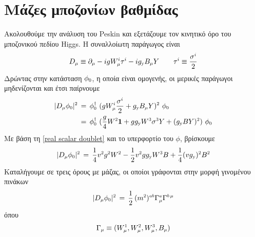 \section{Μάζες μποζονίων βαθμίδας}
Ακολουθούμε την ανάλυση 
του Peskin \cite{Peskin:1995ev} και εξετάζουμε τον κινητικό όρο του μποζονικού πεδίου Higgs. Η συναλλοίωτη παράγωγος είναι 
\begin{equation}\label{covariant derivative electroweak theory}
    D\subscr{\mu}\equiv\partial\subscr{\mu}-igW\superscr{i}\subscr{\mu}\tau\superscr{i}-ig\subscr{\text{y}}B\subscr{\mu}Y\qquad\tau\superscr{i}\equiv\frac{\sigma\superscr{i}}{2}
\end{equation}
Δρώντας στην κατάσταση $\phi\subscr{0}$, η οποία είναι ομογενής, οι μερικές παράγωγοι μηδενίζονται και έτσι παίρνουμε
\begin{equation}
\begin{split}
    |D\subscr{\mu}\phi\subscr{0}|\superscr{2}\,&=\,\phi\subscr{0}\superscr{\dagger}\,\,(gW\superscr{i}\subscr{\mu}\frac{\sigma\superscr{i}}{2}+g\subscr{\y}B\subscr{\mu}Y)\superscr{2}\,\,\phi\subscr{0}\\
    &=\,\phi\subscr{0}\superscr{\dagger}\,\,(\frac{g}{4}W\superscr{2}\mathbf{1}+gg\subscr{\y}W\superscr{3}\sigma\superscr{3}Y+(g\subscr{\y}BY)\superscr{2})\,\,\phi\subscr{0}
\end{split}
\end{equation}
Με βάση τη \eqref{real scalar doublet} και το υπερφορτίο του $\phi$, βρίσκουμε
\begin{equation}
    |D\subscr{\mu}\phi\subscr{0}|\superscr{2}\,=\,\frac{1}{4}v\superscr{2}g\superscr{2}W\superscr{2}-\frac{1}{2}v\superscr{2}gg\subscr{\y}W\superscr{3}B+\frac{1}{4}(vg\subscr{\y})\superscr{2}B\superscr{2}
\end{equation}
Καταλήγουμε σε τρεις όρους με μάζας, 
οι οποίοι 
γράφονται στην 
μορφή γινομένου πινάκων 
\begin{equation}
    |D\subscr{\mu}\phi\subscr{0}|\superscr{2}\,=\,\frac{1}{2}\,(m\superscr{2})\superscr{ab}\Gamma\superscr{a}\subscr{\mu}\Gamma\superscr{b\,\mu}
\end{equation}
όπου
\begin{equation}\label{A quadraplet}
    \Gamma\subscr{\mu}\equiv (W\superscr{1}\subscr{\mu}, W\superscr{2}\subscr{\mu}, W\superscr{3}\subscr{\mu}, B\subscr{\mu})
\end{equation}

